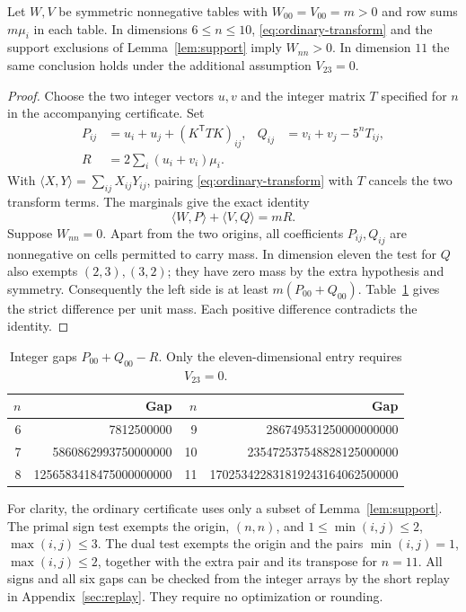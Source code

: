\begin{proposition}\label{prop:ordinary}
Let $W,V$ be symmetric nonnegative tables with $W_{00}=V_{00}=m>0$ and row sums $m\mu_i$ in each table. In dimensions $6\le n\le10$, \eqref{eq:ordinary-transform} and the support exclusions of Lemma~\ref{lem:support} imply $W_{nn}>0$. In dimension $11$ the same conclusion holds under the additional assumption $V_{23}=0$.
\end{proposition}
\begin{proof}
Choose the two integer vectors $u,v$ and the integer matrix $T$ specified for $n$ in the accompanying certificate. Set
\begin{align*}
 P_{ij}&=u_i+u_j+(K^{\mathsf T}TK)_{ij},&
 Q_{ij}&=v_i+v_j-5^nT_{ij},\\
 R&=2\sum_i (u_i+v_i)\mu_i .
\end{align*}
With $\langle X,Y\rangle=\sum_{ij}X_{ij}Y_{ij}$, pairing \eqref{eq:ordinary-transform} with $T$ cancels the two transform terms. The marginals give the exact identity
\[
 \langle W,P\rangle+\langle V,Q\rangle=mR.
\]
Suppose $W_{nn}=0$. Apart from the two origins, all coefficients $P_{ij},Q_{ij}$ are nonnegative on cells permitted to carry mass. In dimension eleven the test for $Q$ also exempts $(2,3),(3,2)$; they have zero mass by the extra hypothesis and symmetry. Consequently the left side is at least $m(P_{00}+Q_{00})$. Table~\ref{tab:gaps} gives the strict difference per unit mass. Each positive difference contradicts the identity.
\end{proof}

\begin{table}[ht]
\centering
\caption{Integer gaps $P_{00}+Q_{00}-R$. Only the eleven-dimensional entry requires $V_{23}=0$.}\label{tab:gaps}
\begin{tabular}{rr@{\qquad}rr}\toprule
$n$ & Gap & $n$ & Gap \\\midrule
6 & 7812500000 & 9 & 286749531250000000000\\
7 & 5860862993750000000 & 10 & 235472537548828125000000\\
8 & 1256583418475000000000 & 11 & 170253422831819243164062500000\\
\bottomrule\end{tabular}
\end{table}

For clarity, the ordinary certificate uses only a subset of Lemma~\ref{lem:support}. The primal sign test exempts the origin, $(n,n)$, and $1\le\min(i,j)\le2$, $\max(i,j)\le3$. The dual test exempts the origin and the pairs $\min(i,j)=1$, $\max(i,j)\le2$, together with the extra pair and its transpose for $n=11$. All signs and all six gaps can be checked from the integer arrays by the short replay in Appendix~\ref{sec:replay}. They require no optimization or rounding.

